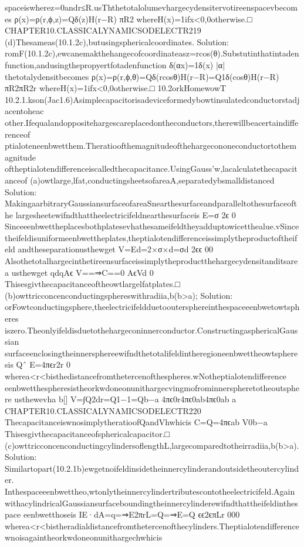 {{{{{{{{{{{spaceiswherez=0andr≤R.usThthetotalolumevhargecydensitervotireenspacevbecomes
ρ(x)=ρ(r,ϕ,z)=Qδ(z)H(r−R)
πR2
whereH(x)=1ifx<0,0otherwise.□
CHAPTER10.CLASSICALYNAMICSODELECTR219
(d)Thesameas(10.1.2c),butusingsphericalcoordinates.
Solution:
romF(10.1.2c),ewcanemakthehangecofcoordinateasz=rcos(θ).Substutinthatintaden
function,andusingthepropyertfotadenfunction
δ(αx)=1δ(x)
|α|
thetotalydensitbecomes
ρ(x)=ρ(r,ϕ,θ)=Qδ(rcosθ)H(r−R)=Q1δ(cosθ)H(r−R)
πR2πR2r
whereH(x)=1ifx<0,0otherwise.□
10.2orkHomewowT
10.2.1.kson(Jac1.6)Asimplecapacitorisadeviceformedybowtinsulatedconductorstadjacentoheac
other.Ifequalandoppositehargescareplacedontheconductors,therewillbeacertaindifferenceof
ptialoteneenbwetthem.Theratioofthemagnitudeofthehargecononeconductortothemagnitude
oftheptialotendifferenceiscalledthecapacitance.UsingGauss’w,lacalculatethecapacitanceof
(a)owtlarge,lfat,conductingsheetsofareaA,separatedybsmalldistanced
Solution:
MakingaarbitraryGaussiansurfaceofareaSnearthesurfaceandparalleltothesurfaceofthe
largesheetewifndthattheelectricifeldnearthesurfaceis
E=σ
2ϵ
0
Sinceeenbwettheplacesbothplatesevhathesameifeldtheyadduptowicetthealue.vSince
theifeldisuniformeenbwettheplates,theptialotendifferenceissimplytheproductoftheifeld
andtheseparationusthewget
V=Ed=2×σ×d=σd
2ϵϵ
00
Alsothetotalhargecinthetireensurfaceissimplytheproductthehargecydensitanditsarea
usthewget
qdqAϵ
V==⇒C==0
AϵVd
0
Thisesgivthecapacitanceoftheowtlargelfatplates.□
(b)owttricconcenconductingsphereswithradiia,b(b>a);
Solution:
orFowtconductingsphere,theelectricifeldduetooutersphereinthespaceeenbwetowtspheres
iszero.Theonlyifeldisduetothehargeconinnerconductor.ConstructingasphericalGaussian
surfaceenclosingtheinnersphereewifndthetotalifeldintheregioneenbwettheowtspheresis
Qˆ
E=4πϵr2r
0
wherea<r<bisthedistancefromthetercenofthespheres.wNotheptialotendifference
eenbwetthespheresistheorkwdoneonunithargecvingmofrominnerspheretotheoutsphere
usthewevha
b[]
V=∫Q2dr=Q1−1=Qb−a
4πϵ0r4πϵ0ab4πϵ0ab
a
CHAPTER10.CLASSICALYNAMICSODELECTR220
ThecapacitanceiswnosimplytheratioofQandVhwhicis
C=Q=4πϵab
V0b−a
Thisesgivthecapacitanceofsphericalcapacitor.□
(c)owttricconcenconductingcylindersoflengthL,largecomparedtotheirradiia,b(b>a).
Solution:
Similartopart(10.2.1b)ewgetnoifeldinsidetheinnercylinderandoutsidetheoutercylinder.
Inthespaceeenbwettheo,wtonlytheinnercylindertributescontotheelectricifeld.Again
withacylindricalGaussiansurfaceboundingtheinnercylinderewifndthattheifeldinthespace
eenbwetthoseis
IE·dA=q=⇒E2πrL=Q=⇒E=Q
ϵϵ2ϵπLr
000
wherea<r<bistheradialdistancefromthetercenofthecylinders.Theptialotendifference
wnoisagaintheorkwdoneonunithargechwhicis
}}}}}}}}}}}
